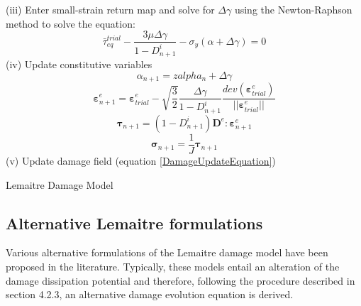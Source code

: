 \documentclass[sn-mathphys,Numbered,draft]{sn-jnl}%
\begin{document}
\begin{algorithm}[H]
(iii) Enter small-strain return map and solve for $\Delta\gamma$ using the Newton-Raphson method to solve the equation:
\begin{equation}
\bar{\tau}_{eq}^{trial}-\frac{3\mu\Delta\gamma}{1-D^{i}_{n+1}}-\sigma_{y}(\alpha+\Delta\gamma)=0\nonumber
\end{equation}
(iv) Update constitutive variables
\begin{equation}
\alpha_{n+1}=zalpha_n+\Delta\gamma\nonumber
\end{equation}
\begin{equation}
\boldsymbol{\varepsilon}^{e}_{n+1}=\boldsymbol{\varepsilon}^{e}_{trial}-\sqrt{\frac{3}{2}}\frac{\Delta\gamma}{1-D^{i}_{n+1}}{\frac{dev(\boldsymbol{\varepsilon}^{e}_{trial})}{\lvert\lvert\boldsymbol{\varepsilon}^{e}_{trial}\rvert\rvert}}\nonumber
\end{equation}
\begin{equation}
\boldsymbol{\tau}_{n+1}=\left(1-D^{i}_{n+1}\right)\mathbf{D}^e:\boldsymbol{\varepsilon}^{e}_{n+1}\nonumber
\end{equation}
\begin{equation}
\boldsymbol{\sigma}_{n+1}=\frac{1}{J}\boldsymbol{\tau}_{n+1}\nonumber
\end{equation}
(v) Update damage field (equation \ref{DamageUpdateEquation})
\caption{Lemaitre Damage Model}
\end{algorithm}



\subsection{Alternative Lemaitre formulations}

Various alternative formulations of the Lemaitre damage model have been proposed in the literature. Typically, these models entail an alteration of the damage dissipation potential \cite{cao_lode-dependent_2014,chandrakanth_isotropic_1995,wei_hua_tai_new_1986,bouchard_enhanced_2011,bonora_nonlinear_1997,malcher_improved_2014,ferreira_improved_2022,castro_calibration_2018,lian_modified_2014} and therefore, following the procedure described in section 4.2.3, an alternative damage evolution equation is derived. 
\end{document}
